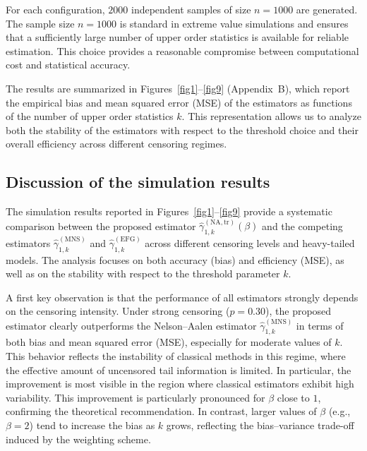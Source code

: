 \documentclass[reqno,openbib,runningheads,a4paper,12pt]{amsart}%
\begin{document}
\noindent For each configuration, $2000$ independent samples of size $n=1000$
are generated. The sample size $n=1000$ is standard in extreme value
simulations and ensures that a sufficiently large number of upper order
statistics is available for reliable estimation. This choice provides a
reasonable compromise between computational cost and statistical
accuracy.\smallskip

\noindent The results are summarized in Figures~\ref{fig1}--\ref{fig9}
(Appendix~B), which report the empirical bias and mean squared error (MSE) of
the estimators as functions of the number of upper order statistics $k$. This
representation allows us to analyze both the stability of the estimators with
respect to the threshold choice and their overall efficiency across different
censoring regimes.

\subsection{Discussion of the simulation results}

\noindent The simulation results reported in Figures~\ref{fig1}--\ref{fig9}
provide a systematic comparison between the proposed estimator
$\widehat{\gamma}_{1,k}^{(\mathrm{NA,tr})}(\beta)$ and the competing
estimators $\widehat{\gamma}_{1,k}^{(\mathrm{MNS})}$ and $\widehat{\gamma
}_{1,k}^{(\mathrm{EFG})}$ across different censoring levels and heavy-tailed
models. The analysis focuses on both accuracy (bias) and efficiency (MSE), as
well as on the stability with respect to the threshold parameter
$k$.\smallskip

\noindent A first key observation is that the performance of all estimators
strongly depends on the censoring intensity. Under strong censoring
($p=0.30$), the proposed estimator clearly outperforms the Nelson--Aalen
estimator $\widehat{\gamma}_{1,k}^{(\mathrm{MNS})}$ in terms of both bias and
mean squared error (MSE), especially for moderate values of $k$. This behavior
reflects the instability of classical methods in this regime, where the
effective amount of uncensored tail information is limited. In particular, the
improvement is most visible in the region where classical estimators exhibit
high variability. This improvement is particularly pronounced for $\beta$
close to $1$, confirming the theoretical recommendation. In contrast, larger
values of $\beta$ (e.g., $\beta=2$) tend to increase the bias as $k$ grows,
reflecting the bias--variance trade-off induced by the weighting
scheme.\smallskip
\end{document}
